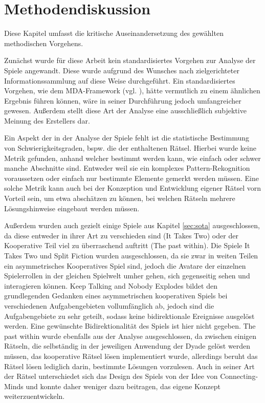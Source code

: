 \section{Methodendiskussion}
Diese Kapitel umfasst die kritische Auseinandersetzung des gewählten methodischen Vorgehens.

Zunächst wurde für diese Arbeit kein standardisiertes Vorgehen zur Analyse der Spiele angewandt. Diese wurde aufgrund des Wunsches nach zielgerichteter Informationssammlung auf diese Weise durchgeführt. Ein standardisiertes Vorgehen, wie dem \ac{MDA}-Framework (vgl. \cite{hunicke_mda_2004}), hätte vermutlich zu einem ähnlichen Ergebnis führen können, wäre in seiner Durchführung jedoch umfangreicher gewesen.
Außerdem stellt diese Art der Analyse eine ausschließlich subjektive Meinung des Erstellers dar.

Ein Aspekt der in der Analyse der Spiele fehlt ist die statistische Bestimmung von Schwierigkeitsgraden, bspw. die der enthaltenen Rätsel. Hierbei wurde keine Metrik gefunden, anhand welcher bestimmt werden kann, wie einfach oder schwer manche Abschnitte sind. Entweder weil sie ein komplexes Pattern-Rekognition voraussetzen oder einfach nur bestimmte Elemente gemerkt werden müssen. Eine solche Metrik kann auch bei der Konzeption und Entwicklung eigener Rätsel vorn Vorteil sein, um etwa abschätzen zu können, bei welchen Rätseln mehrere Lösungshinweise eingebaut werden müssen.

Außerdem wurden auch gezielt einige Spiele aus Kapitel \ref{sec:sota} ausgeschlossen, da diese entweder in ihrer Art zu verschieden sind (It Takes Two) oder der Kooperative Teil viel zu überraschend auftritt (The past within). Die Spiele It Takes Two und Split Fiction wurden ausgeschlossen, da sie zwar in weiten Teilen ein asymmetrisches Kooperatives Spiel sind, jedoch die Avatare der einzelnen Spielerrollen in der gleichen Spielwelt umher gehen, sich gegenseitig sehen und interagieren können. Keep Talking and Nobody Explodes bildet den grundlegenden Gedanken eines asymmetrischen kooperativen Spiels bei verschiedenen Aufgabengebieten vollumfänglich ab, jedoch sind die Aufgabengebiete zu sehr geteilt, sodass keine bidirektionale Ereignisse ausgelöst werden. Eine gewünschte Bidirektionalität des Spiels ist hier nicht gegeben. The past within wurde ebenfalls aus der Analyse ausgeschlossen, da zwischen einigen Rätseln, die selbständig in der jeweiligen Anwendung der Dyade gelöst werden müssen, das kooperative Rätsel lösen implementiert wurde, allerdings beruht das Rätsel lösen lediglich darin, bestimmte Lösungen vorzulesen. Auch in seiner Art der Rätsel unterschiedet sich das Design des Spiels von der Idee von Connecting-Minds und konnte daher weniger dazu beitragen, das eigene Konzept weiterzuentwickeln.



